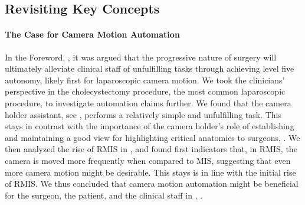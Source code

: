 \subsection{Revisiting Key Concepts}
\label{in:sec:revisiting_key_concepts}
\paragraph{The Case for Camera Motion Automation} In the Foreword, , it was argued that the progressive nature of surgery will ultimately alleviate clinical staff of unfulfilling tasks through achieving level five autonomy, likely first for laparoscopic camera motion. We took the clinicians' perspective in the cholecystectomy procedure, the most common laparoscopic procedure, to investigate automation claims further. We found that the camera holder assistant, see , performs a relatively simple and unfulfilling task. This stays in contrast with the importance of the camera holder's role of establishing and maintaining a good view for highlighting critical anatomies to surgeons, . We then analyzed the rise of RMIS in , and found first indicators that, in RMIS, the camera is moved more frequently when compared to MIS, suggesting that even more camera motion might be desirable. This stays is in line with the initial rise of RMIS. We thus concluded that camera motion automation might be beneficial for the surgeon, the patient, and the clinical staff in , .

